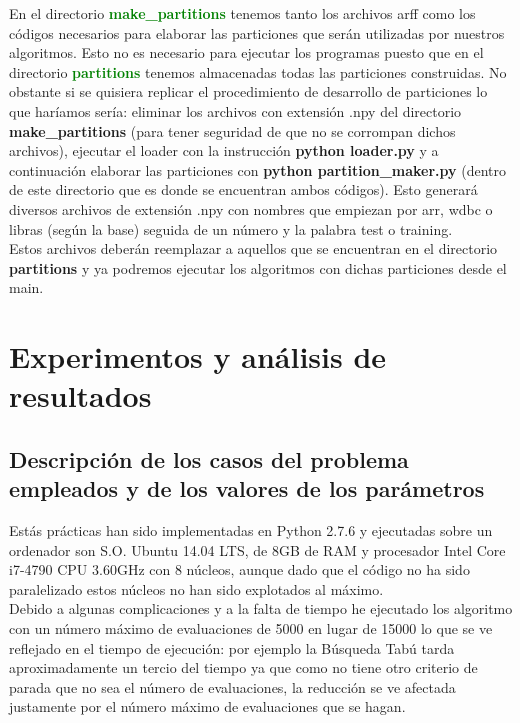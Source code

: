 \documentclass[10pt,a4paper]{article}
\begin{document}
En el directorio \textbf{\textcolor{green}{make\_partitions}} tenemos tanto los archivos arff como los códigos necesarios para elaborar las particiones que serán utilizadas por nuestros algoritmos. Esto no es necesario para ejecutar los programas puesto que en el directorio \textbf{\textcolor{green}{partitions}} tenemos almacenadas todas las particiones construidas. No obstante si se quisiera replicar el procedimiento de desarrollo de particiones lo que haríamos sería: eliminar los archivos con extensión .npy del directorio \textbf{make\_partitions} (para tener seguridad de que no se corrompan dichos archivos), ejecutar el loader con la instrucción \textbf{python loader.py} y a continuación elaborar las particiones con \textbf{python partition\_maker.py} (dentro de este directorio que es donde se encuentran ambos códigos). Esto generará diversos archivos de extensión .npy con nombres que empiezan por arr, wdbc o libras (según la base) seguida de un número y la palabra test o training.\\

Estos archivos deberán reemplazar a aquellos que se encuentran en el directorio \textbf{partitions} y ya podremos ejecutar los algoritmos con dichas particiones desde el main.\\

\newpage
\section{\color[rgb]{0.0,0.0,0.21}Experimentos y análisis de resultados}

\subsection{\color[rgb]{0.0,0.0,0.51}Descripción de los casos del problema empleados y de los valores de los parámetros}


Estás prácticas han sido implementadas en Python 2.7.6 y ejecutadas sobre un ordenador son S.O. Ubuntu 14.04 LTS, de 8GB de RAM y procesador Intel Core i7-4790 CPU 3.60GHz con 8 núcleos, aunque dado que el código no ha sido paralelizado estos núcleos no han sido explotados al máximo.\\

Debido a algunas complicaciones y a la falta de tiempo he ejecutado los algoritmo con un número máximo de evaluaciones de 5000 en lugar de 15000 lo que se ve reflejado en el tiempo de ejecución: por ejemplo la Búsqueda Tabú tarda aproximadamente un tercio del tiempo ya que como no tiene otro criterio de parada que no sea el número de evaluaciones, la reducción se ve afectada justamente por el número máximo de evaluaciones que se hagan.\\
\end{document}
